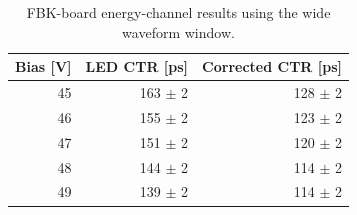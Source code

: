 \begin{table}[htbp]
\centering
\small
\begin{tabular}{rrr}
\toprule
Bias [V] & LED CTR [ps] & Corrected CTR [ps] \\
\midrule
45 & 163 $\pm$ 2 & 128 $\pm$ 2 \\
46 & 155 $\pm$ 2 & 123 $\pm$ 2 \\
47 & 151 $\pm$ 2 & 120 $\pm$ 2 \\
48 & 144 $\pm$ 2 & 114 $\pm$ 2 \\
49 & 139 $\pm$ 2 & 114 $\pm$ 2 \\
\bottomrule
\end{tabular}
\caption{FBK-board energy-channel results using the wide waveform window.}
\label{tab:fbk-energy-wide}
\end{table}

